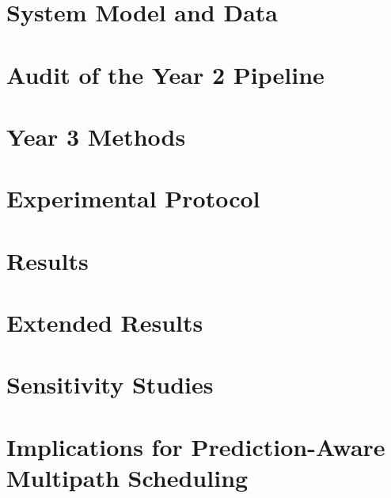 \documentclass[11pt]{article}
\begin{document}
\section{System Model and Data}


\section{Audit of the Year 2 Pipeline}
\label{sec:audit}


\section{Year 3 Methods}
\label{sec:methods}


\section{Experimental Protocol}
\label{sec:protocol}


\section{Results}
\label{sec:results}


\section{Extended Results}
\label{sec:extended}


\section{Sensitivity Studies}
\label{sec:sensitivity}


\section{Implications for Prediction-Aware Multipath Scheduling}
\label{sec:sched}

\end{document}
